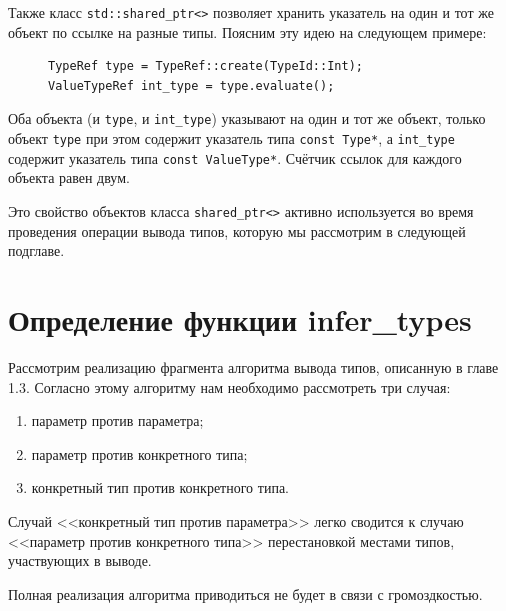 Также класс \lstinline!std::shared_ptr<>! позволяет хранить указатель на один и тот же объект по ссылке на разные типы. Поясним эту идею на следующем примере:
\begin{figure}[H]
	\begin{lstlisting}
TypeRef type = TypeRef::create(TypeId::Int);
ValueTypeRef int_type = type.evaluate();
	\end{lstlisting}
\end{figure}
Оба объекта (и \lstinline!type!, и \lstinline!int_type!) указывают на один и тот же объект, только объект \lstinline!type! при этом содержит указатель типа \lstinline!const Type*!, а \lstinline!int_type! содержит указатель типа \lstinline!const ValueType*!. Счётчик ссылок для каждого объекта равен двум.

Это свойство объектов класса \lstinline!shared_ptr<>! активно используется во время проведения операции вывода типов, которую мы рассмотрим в следующей подглаве.

\section{Определение функции infer\_types}

Рассмотрим реализацию фрагмента алгоритма вывода типов, описанную в главе 1.3.
Согласно этому алгоритму нам необходимо рассмотреть три случая:
\begin{enumerate}[1)]
	\item параметр против параметра;
	\item параметр против конкретного типа;
	\item конкретный тип против конкретного типа.
\end{enumerate}
Случай <<конкретный тип против параметра>> легко сводится к случаю <<параметр против конкретного типа>> перестановкой местами типов, участвующих в выводе.

Полная реализация алгоритма приводиться не будет в связи с громоздкостью.

